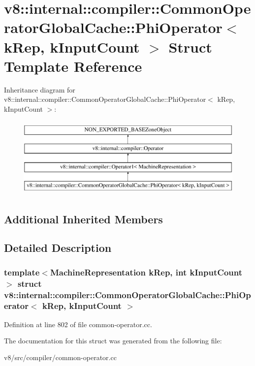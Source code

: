 \hypertarget{structv8_1_1internal_1_1compiler_1_1CommonOperatorGlobalCache_1_1PhiOperator}{}\section{v8\+:\+:internal\+:\+:compiler\+:\+:Common\+Operator\+Global\+Cache\+:\+:Phi\+Operator$<$ k\+Rep, k\+Input\+Count $>$ Struct Template Reference}
\label{structv8_1_1internal_1_1compiler_1_1CommonOperatorGlobalCache_1_1PhiOperator}
Inheritance diagram for v8\+:\+:internal\+:\+:compiler\+:\+:Common\+Operator\+Global\+Cache\+:\+:Phi\+Operator$<$ k\+Rep, k\+Input\+Count $>$\+:\begin{figure}[H]
\begin{center}
\leavevmode
\includegraphics[height=4.000000cm]{structv8_1_1internal_1_1compiler_1_1CommonOperatorGlobalCache_1_1PhiOperator}
\end{center}
\end{figure}
\subsection*{Additional Inherited Members}


\subsection{Detailed Description}
\subsubsection*{template$<$Machine\+Representation k\+Rep, int k\+Input\+Count$>$\newline
struct v8\+::internal\+::compiler\+::\+Common\+Operator\+Global\+Cache\+::\+Phi\+Operator$<$ k\+Rep, k\+Input\+Count $>$}



Definition at line 802 of file common-\/operator.\+cc.



The documentation for this struct was generated from the following file\+:\begin{DoxyCompactItemize}
\item 
v8/src/compiler/common-\/operator.\+cc\end{DoxyCompactItemize}
